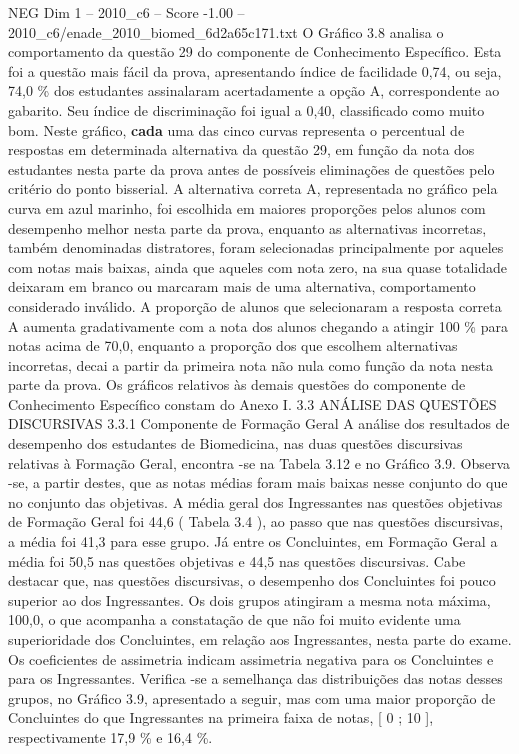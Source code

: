\begin{textsample}{NEG Dim 1 – 2010\_c6 – Score -1.00 – 2010\_c6/enade\_2010\_biomed\_6d2a65c171.txt}
O Gráfico 3.8 analisa o comportamento da questão 29 do componente de Conhecimento Específico.
Esta foi a questão mais fácil da prova, apresentando índice de facilidade 0,74, ou seja, 74,0 \% dos estudantes assinalaram acertadamente a opção A, correspondente ao gabarito.
Seu índice de discriminação foi igual a 0,40, classificado como muito bom.
Neste gráfico, \textbf{cada} uma das cinco curvas representa o percentual de respostas em determinada alternativa da questão 29, em função da nota dos estudantes nesta parte da prova antes de possíveis eliminações de questões pelo critério do ponto bisserial.
A alternativa correta A, representada no gráfico pela curva em azul marinho, foi escolhida em maiores proporções pelos alunos com desempenho melhor nesta parte da prova, enquanto as alternativas incorretas, também denominadas distratores, foram selecionadas principalmente por aqueles com notas mais baixas, ainda que aqueles com nota zero, na sua quase totalidade deixaram em branco ou marcaram mais de uma alternativa, comportamento considerado inválido.
A proporção de alunos que selecionaram a resposta correta A aumenta gradativamente com a nota dos alunos chegando a atingir 100 \% para notas acima de 70,0, enquanto a proporção dos que escolhem alternativas incorretas, decai a partir da primeira nota não nula como função da nota nesta parte da prova.
Os gráficos relativos às demais questões do componente de Conhecimento Específico constam do Anexo I. 3.3 ANÁLISE DAS QUESTÕES DISCURSIVAS 3.3.1 Componente de Formação Geral A análise dos resultados de desempenho dos estudantes de Biomedicina, nas duas questões discursivas relativas à Formação Geral, encontra -se na Tabela 3.12 e no Gráfico 3.9.
Observa -se, a partir destes, que as notas médias foram mais baixas nesse conjunto do que no conjunto das objetivas.
A média geral dos Ingressantes nas questões objetivas de Formação Geral foi 44,6 ( Tabela 3.4 ), ao passo que nas questões discursivas, a média foi 41,3 para esse grupo.
Já entre os Concluintes, em Formação Geral a média foi 50,5 nas questões objetivas e 44,5 nas questões discursivas.
Cabe destacar que, nas questões discursivas, o desempenho dos Concluintes foi pouco superior ao dos Ingressantes.
Os dois grupos atingiram a mesma nota máxima, 100,0, o que acompanha a constatação de que não foi muito evidente uma superioridade dos Concluintes, em relação aos Ingressantes, nesta parte do exame.
Os coeficientes de assimetria indicam assimetria negativa para os Concluintes e para os Ingressantes.
Verifica -se a semelhança das distribuições das notas desses grupos, no Gráfico 3.9, apresentado a seguir, mas com uma maior proporção de Concluintes do que Ingressantes na primeira faixa de notas, [ 0 ; 10 ], respectivamente 17,9 \% e 16,4 \%.

\end{textsample}
